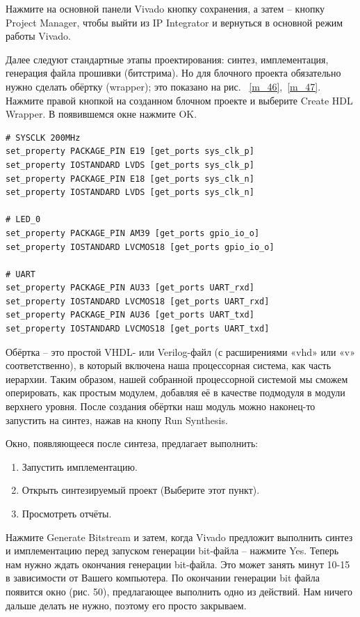 \documentclass[a4paper,oneside ,10pt]{extreport}
\begin{document}
Нажмите на основной панели Vivado кнопку сохранения, а затем – кнопку 
Project Manager, чтобы выйти из IP Integrator и вернуться в основной режим работы 
Vivado.

Далее следуют стандартные этапы проектирования: синтез, имплементация, 
генерация файла прошивки (битстрима). Но для блочного проекта обязательно 
нужно сделать обёртку (wrapper); это показано на рис. ~\ref{m_46},~\ref{m_47}. Нажмите правой кнопкой на созданном блочном проекте и выберите Create HDL Wrapper. В появившемся 
окне нажмите OK.

\begin{Verbatim}[tabsize=4]
# SYSCLK 200MHz
set_property PACKAGE_PIN E19 [get_ports sys_clk_p]
set_property IOSTANDARD LVDS [get_ports sys_clk_p]
set_property PACKAGE_PIN E18 [get_ports sys_clk_n]
set_property IOSTANDARD LVDS [get_ports sys_clk_n]

# LED_0
set_property PACKAGE_PIN AM39 [get_ports gpio_io_o]
set_property IOSTANDARD LVCMOS18 [get_ports gpio_io_o]

# UART
set_property PACKAGE_PIN AU33 [get_ports UART_rxd]
set_property IOSTANDARD LVCMOS18 [get_ports UART_rxd]
set_property PACKAGE_PIN AU36 [get_ports UART_txd]
set_property IOSTANDARD LVCMOS18 [get_ports UART_txd]

\end{Verbatim}

Обёртка – это простой VHDL- или Verilog-файл (с расширениями «vhd» или 
«v» соответственно), в который включена наша процессорная система, как часть 
иерархии. Таким образом, нашей собранной процессорной системой мы сможем 
оперировать, как простым модулем, добавляя её в качестве подмодуля в модули 
верхнего уровня. После создания обёртки наш модуль можно наконец-то запустить 
на синтез, нажав на кнопу Run Synthesis.

Окно, появляющееся после синтеза, предлагает выполнить:
\begin{enumerate}
	\item Запустить имплементацию.
	\item Открыть синтезируемый проект (Выберите этот пункт).
	\item Просмотреть отчёты.
\end{enumerate}
Нажмите Generate Bitstream и затем, когда Vivado предложит выполнить 
синтез и имплементацию перед запуском генерации bit-файла – нажмите Yes.
Теперь нам нужно ждать окончания генерации bit-файла. Это может занять 
минут 10-15 в зависимости от Вашего компьютера. 
По окончании генерации bit файла появится окно (рис. 50), предлагающее выполнить одно из действий. Нам 
ничего дальше делать не нужно, поэтому его просто закрываем.
\end{document}
